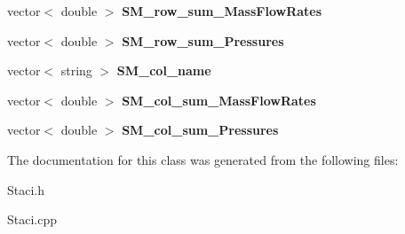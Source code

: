 \begin{DoxyCompactItemize}
\item 
\hypertarget{class_staci_a7b12823f45158095f1dada4da44196a5}{}\label{class_staci_a7b12823f45158095f1dada4da44196a5} 
vector$<$ double $>$ {\bfseries S\+M\+\_\+row\+\_\+sum\+\_\+\+Mass\+Flow\+Rates}
\item 
\hypertarget{class_staci_a3583d4f48a560fc7d690ce23bf2a0b99}{}\label{class_staci_a3583d4f48a560fc7d690ce23bf2a0b99} 
vector$<$ double $>$ {\bfseries S\+M\+\_\+row\+\_\+sum\+\_\+\+Pressures}
\item 
\hypertarget{class_staci_a65be5fdc061a8b906b12758fae210cef}{}\label{class_staci_a65be5fdc061a8b906b12758fae210cef} 
vector$<$ string $>$ {\bfseries S\+M\+\_\+col\+\_\+name}
\item 
\hypertarget{class_staci_a88c1be986fb791fc2d6dcf188e492ee4}{}\label{class_staci_a88c1be986fb791fc2d6dcf188e492ee4} 
vector$<$ double $>$ {\bfseries S\+M\+\_\+col\+\_\+sum\+\_\+\+Mass\+Flow\+Rates}
\item 
\hypertarget{class_staci_af7abda3370dc818d72e570aa2f5e9225}{}\label{class_staci_af7abda3370dc818d72e570aa2f5e9225} 
vector$<$ double $>$ {\bfseries S\+M\+\_\+col\+\_\+sum\+\_\+\+Pressures}
\end{DoxyCompactItemize}


The documentation for this class was generated from the following files\+:\begin{DoxyCompactItemize}
\item 
Staci.\+h\item 
Staci.\+cpp\end{DoxyCompactItemize}
